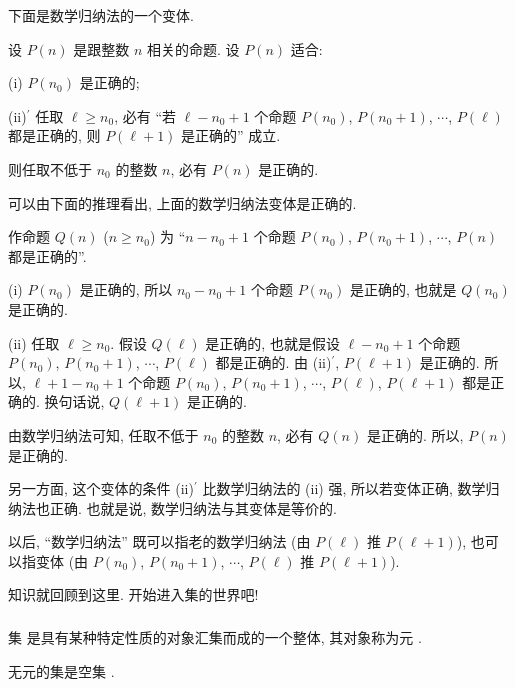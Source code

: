 下面是数学归纳法的一个变体.

\begin{proposition}
    设 $P(n)$ 是跟整数 $n$ 相关的命题. 设 $P(n)$ 适合:

    (i) $P(n_0)$ 是正确的;

    (ii)$^{\prime}$ 任取 $\ell \geq n_0$, 必有 ``若 $\ell - n_0 + 1$ 个命题 $P(n_0)$, $P(n_0 + 1)$, $\cdots$, $P(\ell)$ 都是正确的, 则 $P(\ell + 1)$ 是正确的'' 成立.

    则任取不低于 $n_0$ 的整数 $n$, 必有 $P(n)$ 是正确的.
\end{proposition}

\begin{remark}
    可以由下面的推理看出, 上面的数学归纳法变体是正确的.

    作命题 $Q(n)$ ($n \geq n_0$) 为 ``$n - n_0 + 1$ 个命题 $P(n_0)$, $P(n_0 + 1)$, $\cdots$, $P(n)$ 都是正确的''.

    (i) $P(n_0)$ 是正确的, 所以 $n_0 - n_0 + 1$ 个命题 $P(n_0)$ 是正确的, 也就是 $Q(n_0)$ 是正确的.

    (ii) 任取 $\ell \geq n_0$. 假设 $Q(\ell)$ 是正确的, 也就是假设 $\ell - n_0 + 1$ 个命题 $P(n_0)$, $P(n_0 + 1)$, $\cdots$, $P(\ell)$ 都是正确的. 由 (ii)$^{\prime}$, $P(\ell + 1)$ 是正确的. 所以, $\ell + 1 - n_0 + 1$ 个命题 $P(n_0)$, $P(n_0 + 1)$, $\cdots$, $P(\ell)$, $P(\ell + 1)$ 都是正确的. 换句话说, $Q(\ell + 1)$ 是正确的.

    由数学归纳法可知, 任取不低于 $n_0$ 的整数 $n$, 必有 $Q(n)$ 是正确的. 所以, $P(n)$ 是正确的.

    另一方面, 这个变体的条件 (ii)$^{\prime}$ 比数学归纳法的 (ii) 强, 所以若变体正确, 数学归纳法也正确. 也就是说, 数学归纳法与其变体是等价的.

    以后, ``数学归纳法'' 既可以指老的数学归纳法 (由 $P(\ell)$ 推 $P(\ell+1)$), 也可以指变体 (由 $P(n_0)$, $P(n_0 + 1)$, $\cdots$, $P(\ell)$ 推 $P(\ell+1)$).
\end{remark}

知识就回顾到这里. 开始进入集的世界吧!

\subsubsection*{\Sets}

\begin{definition}
    集  是具有某种特定性质的对象汇集而成的一个整体, 其对象称为元 .
\end{definition}

\begin{definition}
    无元的集是空集 .
\end{definition}

